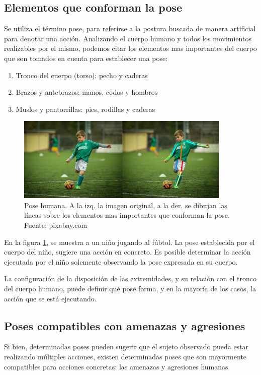 \documentclass[a4paper,12pt,oneside,spanish]{book}
\begin{document}
\subsection{Elementos que conforman la pose}
Se utiliza el término pose, para referirse a la postura buscada de manera artificial para denotar una acción. Analizando el cuerpo humano y todos los movimientos realizables por el mismo, podemos citar los elementos mas importantes del cuerpo que son tomados en cuenta para establecer una pose: 
\begin{enumerate}[noitemsep]
	\baselineskip 14pt
	\item Tronco del cuerpo (torso): pecho y caderas  
	\item Brazos y antebrazos: manos, codos y hombros  
	\item Muslos y pantorrillas: pies, rodillas y caderas
\end{enumerate}	\baselineskip 14pt

\begin{figure}[h!]
	\includegraphics[width=290pt]{Imagenes/pose1.jpg}
	\centering
	\caption{Pose humana. A la izq. la imagen original, a la der. se dibujan las líneas sobre los elementos mas importantes que conforman la pose. Fuente: pixabay.com}
	\label{fig:pose1}
\end{figure}

En la figura \ref{fig:pose1}, se muestra a un niño jugando al fúbtol. La pose establecida por el cuerpo del niño, sugiere una acción en concreto. Es posible determinar la acción ejecutada por el niño solemente observando la pose expresada en su cuerpo. \par

La configuración de la disposición de las extremidades, y su relación con el tronco del cuerpo humano, puede definir qué pose forma, y en la mayoría de los casos, la acción que se está ejecutando. \par

\subsection{Poses compatibles con amenazas y agresiones}
Si bien, determinadas poses pueden sugerir que el sujeto observado pueda estar realizando múltiples acciones, existen determinadas poses que son mayormente compatibles para acciones concretas: las amenazas y agresiones humanas.\par
\end{document}
